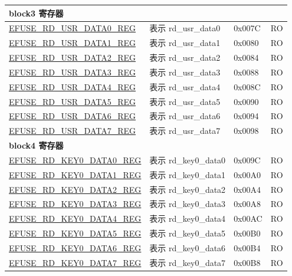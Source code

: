 \begin{longtable}{ | p{7cm} | p{6cm} | p{1.2cm} | p{1.5cm} | }
\multicolumn{4}{|l|}{\textbf{block3 寄存器}} \\ \hline
\hyperref[regdesc:EFUSERDUSRDATANREG]{EFUSE\_RD\_USR\_DATA0\_REG} & 表示 rd\_usr\_data0 & 0x007C & RO \\ \hline
\hyperref[regdesc:EFUSERDUSRDATANREG]{EFUSE\_RD\_USR\_DATA1\_REG} & 表示 rd\_usr\_data1 & 0x0080 & RO \\ \hline
\hyperref[regdesc:EFUSERDUSRDATANREG]{EFUSE\_RD\_USR\_DATA2\_REG} & 表示 rd\_usr\_data2 & 0x0084 & RO \\ \hline
\hyperref[regdesc:EFUSERDUSRDATANREG]{EFUSE\_RD\_USR\_DATA3\_REG} & 表示 rd\_usr\_data3 & 0x0088 & RO \\ \hline
\hyperref[regdesc:EFUSERDUSRDATANREG]{EFUSE\_RD\_USR\_DATA4\_REG} & 表示 rd\_usr\_data4 & 0x008C & RO \\ \hline
\hyperref[regdesc:EFUSERDUSRDATANREG]{EFUSE\_RD\_USR\_DATA5\_REG} & 表示 rd\_usr\_data5 & 0x0090 & RO \\ \hline
\hyperref[regdesc:EFUSERDUSRDATANREG]{EFUSE\_RD\_USR\_DATA6\_REG} & 表示 rd\_usr\_data6 & 0x0094 & RO \\ \hline
\hyperref[regdesc:EFUSERDUSRDATANREG]{EFUSE\_RD\_USR\_DATA7\_REG} & 表示 rd\_usr\_data7 & 0x0098 & RO \\ \hline
\multicolumn{4}{|l|}{\textbf{block4 寄存器}} \\ \hline
\hyperref[regdesc:EFUSERDKEY0DATANREG]{EFUSE\_RD\_KEY0\_DATA0\_REG} & 表示 rd\_key0\_data0 & 0x009C & RO \\ \hline
\hyperref[regdesc:EFUSERDKEY0DATANREG]{EFUSE\_RD\_KEY0\_DATA1\_REG} & 表示 rd\_key0\_data1 & 0x00A0 & RO \\ \hline
\hyperref[regdesc:EFUSERDKEY0DATANREG]{EFUSE\_RD\_KEY0\_DATA2\_REG} & 表示 rd\_key0\_data2 & 0x00A4 & RO \\ \hline
\hyperref[regdesc:EFUSERDKEY0DATANREG]{EFUSE\_RD\_KEY0\_DATA3\_REG} & 表示 rd\_key0\_data3 & 0x00A8 & RO \\ \hline
\hyperref[regdesc:EFUSERDKEY0DATANREG]{EFUSE\_RD\_KEY0\_DATA4\_REG} & 表示 rd\_key0\_data4 & 0x00AC & RO \\ \hline
\hyperref[regdesc:EFUSERDKEY0DATANREG]{EFUSE\_RD\_KEY0\_DATA5\_REG} & 表示 rd\_key0\_data5 & 0x00B0 & RO \\ \hline
\hyperref[regdesc:EFUSERDKEY0DATANREG]{EFUSE\_RD\_KEY0\_DATA6\_REG} & 表示 rd\_key0\_data6 & 0x00B4 & RO \\ \hline
\hyperref[regdesc:EFUSERDKEY0DATANREG]{EFUSE\_RD\_KEY0\_DATA7\_REG} & 表示 rd\_key0\_data7 & 0x00B8 & RO \\ \hline

\end{longtable}
